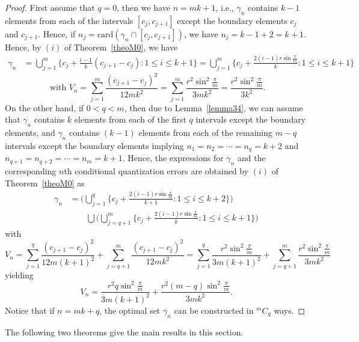 \documentclass[12pt, reqno]{amsart}
\theoremstyle{plain}
\theoremstyle{definition}
\newcommand{\ii}{\cap}%
\newcommand{\UU}{\bigcup}%
\renewcommand{\gg}{\gamma}%
\newcommand{\te}{\text}%
\begin{document}
\begin{proof} 
First assume that $q=0$, then we have $n=mk+1$, i.e., $\gg_n$ contains $k-1$ elements from each of the intervals $[c_j, c_{j+1}]$ except the boundary elements $c_j$ and $c_{j+1}$. Hence, if $n_j=\te{card}(\gg_n\ii [c_j, c_{j+1}])$, we have $n_j=k-1+2=k+1$. Hence, by $(i)$ of Theorem~\ref{theoM0}, we have 
\begin{align*}
\gg_n& = \UU_{j=1}^{m}\{c_j+\frac{i-1}{k}(c_{j+1}-c_{j}) : 1\leq i\leq k+1\}=\UU_{j=1}^{m}\{c_j+\frac{2(i-1)r\sin \frac{\pi}m}{k}  : 1\leq i\leq k+1\}
\end{align*}
\[ \te{ with } V_n=\sum_{j=1}^m \frac {(c_{j+1}-c_j)^2}{12mk^2}=\sum_{j=1}^m \frac {r^2 \sin^2\frac{\pi} m}{3mk^2}=\frac {r^2 \sin^2\frac{\pi} m}{3k^2}.\]
On the other hand, if $0<q<m$, then due to Lemma~\ref{lemma34}, we can assume that $\gg_n$ contains $k$ elements from each of the first $q$ intervals except the boundary elements, and $\gg_n$ contains $(k-1)$ elements from each of the remaining $m-q$ intervals except the boundary elements implying $n_1=n_2=\cdots=n_q=k+2$ and $n_{q+1}=n_{q+2}=\cdots=n_m=k+1$. Hence, the expressions for $\gg_n$ and the corresponding $n$th conditional quantization errors  are  obtained by  $(i)$ of Theorem~\ref{theoM0} as 
\begin{align*}
\gg_n  &= \Big(\UU_{j=1}^{q}\{c_j+\frac{2(i-1)r\sin \frac{\pi}m}{k+1} : 1\leq i\leq k+2\}\Big)\\
&\qquad \UU \Big(\UU_{j=q+1}^{m}\{c_j+\frac{2(i-1)r\sin \frac{\pi}m}{k}  : 1\leq i\leq k+1\}\Big)
\end{align*} 
 with  
 \[V_n=\sum_{j=1}^q \frac {(c_{j+1}-c_j)^2}{12 m(k+1)^2}+\sum_{j=q+1}^m \frac {(c_{j+1}-c_j)^2}{12mk^2}=\sum_{j=1}^q \frac {r^2\sin^2\frac{\pi} m}{3m(k+1)^2}+\sum_{j=q+1}^m \frac {r^2\sin^2\frac{\pi} m}{3mk^2}\] 
 yielding \[V_n=\frac {r^2q\sin^2\frac{\pi} m}{3m(k+1)^2}+ \frac {r^2(m-q)\sin^2\frac{\pi} m}{3mk^2}.\]
 Notice that if $n=mk+q$, the optimal set $\gg_n$ can be constructed in $^mC_q$ ways. 
\end{proof} 

The following two theorems give the main results in this section. 
\end{document}
